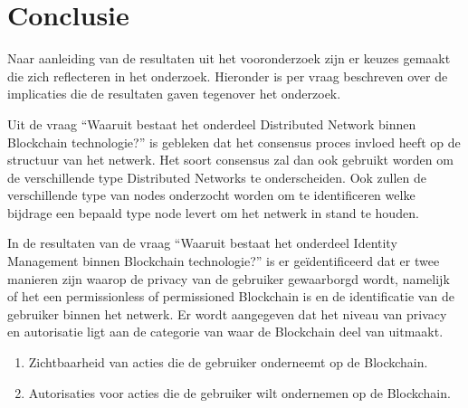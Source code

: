\section{Conclusie}

Naar aanleiding van de resultaten uit het vooronderzoek zijn er keuzes gemaakt die zich reflecteren in het onderzoek. Hieronder is per vraag beschreven over de implicaties die de resultaten gaven tegenover het onderzoek. 

Uit de vraag ``Waaruit bestaat het onderdeel Distributed Network binnen Blockchain technologie?'' is gebleken dat het consensus proces invloed heeft op de structuur van het netwerk. Het soort consensus zal dan ook gebruikt worden om de verschillende type Distributed Networks te onderscheiden. Ook zullen de verschillende type van nodes onderzocht worden om te identificeren welke bijdrage een bepaald type node levert om het netwerk in stand te houden. 

In de resultaten van de vraag ``Waaruit bestaat het onderdeel Identity Management binnen Blockchain technologie?'' is er geïdentificeerd dat er twee manieren zijn waarop de privacy van de gebruiker gewaarborgd wordt, namelijk of het een permissionless of permissioned Blockchain is en de identificatie van de gebruiker binnen het netwerk. Er wordt aangegeven dat het niveau van privacy en autorisatie ligt aan de categorie van waar de Blockchain deel van uitmaakt.

\begin{enumerate}[noitemsep]
  \item Zichtbaarheid van acties die de gebruiker onderneemt op de Blockchain.
  \item Autorisaties voor acties die de gebruiker wilt ondernemen op de Blockchain.
\end{enumerate}
